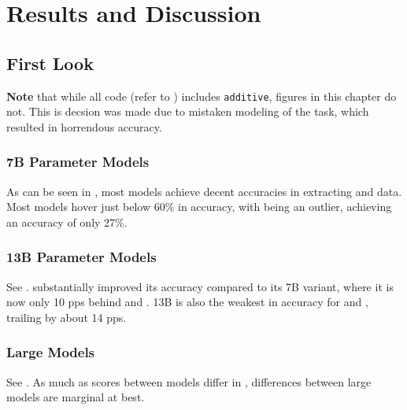 \chapter{Results and Discussion}\label{chap:results}






\section{First Look}\label{sec:result:first}
\textbf{Note} that while all code (refer to ) includes \texttt{additive}, figures in this chapter do not.
This is decsion was made due to mistaken modeling of the task, which resulted in horrendous accuracy.

\subsection{7B Parameter Models}\label{sub:result:7b}
As can be seen in , most models achieve decent accuracies in extracting \ttemp and \ttime data.
Most models hover just below 60\% in \tsolv accuracy, with  being an outlier, achieving an accuracy of only 27\%.

\subsection{13B Parameter Models}\label{sub:result:13b}
See .
 substantially improved its \tsolv accuracy compared to its 7B variant, where it is now only 10 \glspl{pp} behind  and .
 13B is also the weakest in accuracy for \ttemp and \ttime, trailing by about 14 \glspl{pp}.

\subsection{Large Models}\label{sub:result:large}
See . As much as scores between models differ in , differences between large models are marginal at best. 

